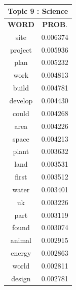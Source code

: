 \begin{table}[h!]
\begin{tabular}{|c c|}
 \end{tabular} 
\\[1cm]
 \begin{tabular}{|c c|} 
\hline
\multicolumn{2}{|c|}{\textbf{Topic 9 : Science}} \\
\hline
 \textbf{WORD} & \textbf{PROB}.  \\ [0.3ex] 
 \hline
 site  & 0.006374  \\ 
	project  &   0.005936  \\ 
	plan   &  0.005232  \\ 
	work   &  0.004813  \\ 
	build   &  0.004781  \\ 
	develop  &   0.004430  \\ 
	could &    0.004268  \\ 
	area  &   0.004226  \\ 
	space  &   0.004213  \\ 
	plant  &   0.003632  \\ 
	land   &  0.003531  \\ 
	first  &   0.003512  \\ 
	water   &  0.003401  \\ 
	uk   &  0.003226  \\ 
	part  &   0.003119  \\ 
	found  &   0.003074  \\ 
	animal  &  0.002915  \\ 
	energy  &   0.002863  \\ 
	world   &  0.002811  \\ 
	design   &  0.002781 \\ [1ex] 
 \hline
  

\end{tabular}
\end{table}
